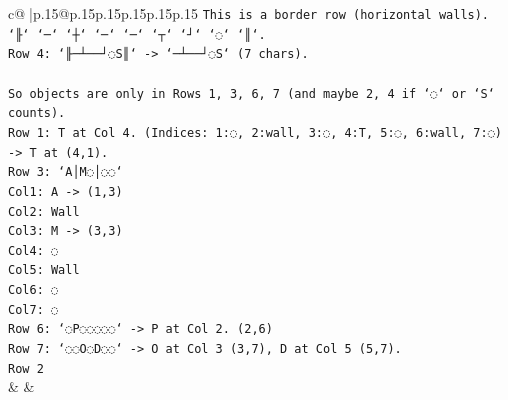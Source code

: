 \documentclass{article}
\begin{document}
{\begin{supertabular}{c@{$\;$}|p{.15\linewidth}@{}p{.15\linewidth}p{.15\linewidth}p{.15\linewidth}p{.15\linewidth}p{.15\linewidth}}
{{{\texttt{This is a border row (horizontal walls). `╟` `─` `┼` `─` `─` `┬` `┘` `◌` `║`.} \\
\texttt{Row 4: `╟─┴──┘◌S║` {-}> `─┴──┘◌S` (7 chars).} \\
\\ 
\texttt{So objects are only in Rows 1, 3, 6, 7 (and maybe 2, 4 if `◌` or `S` counts).} \\
\texttt{Row 1: T at Col 4. (Indices: 1:◌, 2:wall, 3:◌, 4:T, 5:◌, 6:wall, 7:◌) {-}> T at (4,1).} \\
\texttt{Row 3: `A│M◌│◌◌`} \\
\texttt{Col1: A {-}> (1,3)} \\
\texttt{Col2: Wall} \\
\texttt{Col3: M {-}> (3,3)} \\
\texttt{Col4: ◌} \\
\texttt{Col5: Wall} \\
\texttt{Col6: ◌} \\
\texttt{Col7: ◌} \\
\texttt{Row 6: `◌P◌◌◌◌◌` {-}> P at Col 2. (2,6)} \\
\texttt{Row 7: `◌◌O◌D◌◌` {-}> O at Col 3 (3,7), D at Col 5 (5,7).} \\
\texttt{Row 2} \\
            }
        }
    }
    & & \\ \\


\end{supertabular}}
\end{document}
